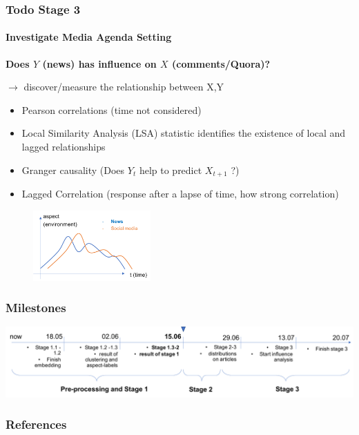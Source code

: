 \documentclass{tum-presentation}
\begin{document}
\begin{frame}
  \frametitle{Todo Stage 3}
 \framesubtitle{Investigate Media Agenda Setting}
 \begin{description}
  \large
  \item \textbf {Does $Y$ (news) has influence on $X$ (comments/Quora)? }
  \pause 
  \normalsize
  \item $\to$ discover/measure the relationship between X,Y
  \begin{itemize}
  \item Pearson correlations (time not considered)
  \item Local Similarity Analysis (LSA) statistic identifies the existence of local and lagged relationships
  \item Granger causality (Does $Y_t$ help to predict $X_{t+1}$ ?)
  \item Lagged Correlation (response after a lapse of time, how strong correlation)
  
  \end{itemize}
  \pause 
\begin{figure}[]
  \centering
  \includegraphics[width = 0.4\textwidth]{figures/timecor.pdf}
  \label{}
\end{figure}
 

\end{description}
\end{frame}

\begin{frame}
  \frametitle{Milestones}
  \vspace{2cm}
 \includegraphics[width = \textwidth]{figures/timeline.pdf}
  
\end{frame}


\begin{frame}
  \frametitle{References}
 
  \printbibliography

\end{frame}
\end{document}

